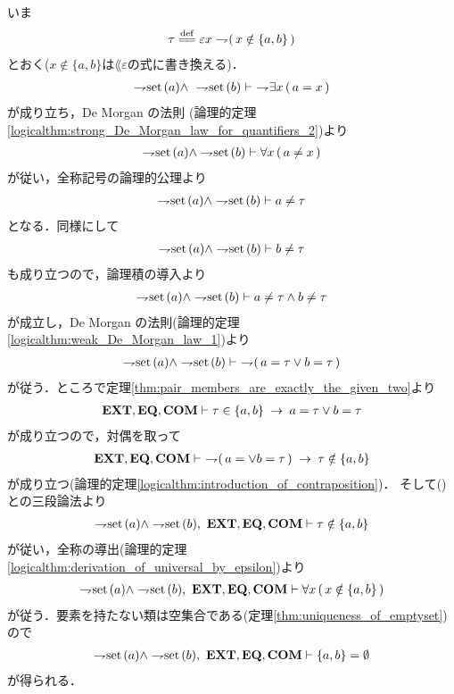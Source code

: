 	\begin{sketch}
		いま
		\begin{align}
			\tau \defeq \varepsilon x \negation (\, x \notin \{a,b\}\, )
		\end{align}
		とおく($x \notin \{a,b\}$は$\lang{\varepsilon}$の式に書き換える)．
		\begin{align}
			\rightharpoondown\hspace{-0.25em} \operatorname*{set}\hspace{0.15em}(a) \wedge\ \rightharpoondown\hspace{-0.25em} \operatorname*{set}\hspace{0.15em}(b)
			\vdash\ \rightharpoondown\hspace{-0.25em} \exists x\, (\, a = x\, )
		\end{align}
		が成り立ち，De Morgan の法則
		(論理的定理\ref{logicalthm:strong_De_Morgan_law_for_quantifiers_2})より
		\begin{align}
			\rightharpoondown\hspace{-0.25em} \operatorname*{set}\hspace{0.15em}(a) \wedge \rightharpoondown\hspace{-0.25em} \operatorname*{set}\hspace{0.15em}(b)
			\vdash \forall x\, (\, a \neq x\, )
		\end{align}
		が従い，全称記号の論理的公理より
		\begin{align}
			\rightharpoondown\hspace{-0.25em} \operatorname*{set}\hspace{0.15em}(a) \wedge \rightharpoondown\hspace{-0.25em} \operatorname*{set}\hspace{0.15em}(b) \vdash a \neq \tau
		\end{align}
		となる．同様にして
		\begin{align}
			\rightharpoondown\hspace{-0.25em} \operatorname*{set}\hspace{0.15em}(a) \wedge \rightharpoondown\hspace{-0.25em} \operatorname*{set}\hspace{0.15em}(b) \vdash b \neq \tau
		\end{align}
		も成り立つので，論理積の導入より
		\begin{align}
			\rightharpoondown\hspace{-0.25em} \operatorname*{set}\hspace{0.15em}(a) \wedge \rightharpoondown\hspace{-0.25em} \operatorname*{set}\hspace{0.15em}(b) \vdash
			a \neq \tau \wedge b \neq \tau
		\end{align}
		が成立し，De Morgan の法則(論理的定理\ref{logicalthm:weak_De_Morgan_law_1})より
		\begin{align}
			\negation \set{a} \wedge \negation \set{b} \vdash\ 
			\negation (\, a = \tau \vee b = \tau\, )
			\label{fom:pair_of_proper_classes_is_emptyset_1}
		\end{align}
		が従う．ところで定理\ref{thm:pair_members_are_exactly_the_given_two}より
		\begin{align}
			\mbox{{\bf EXT}},\mbox{{\bf EQ}},\mbox{\bf COM} \vdash \tau \in \{a,b\} \hspace{0.25em}\rightarrow\hspace{0.25em} a = \tau \vee b = \tau
		\end{align}
		が成り立つので，対偶を取って
		\begin{align}
			\EXTAX,\EQAX,\COMAX \vdash\ 
			\negation (\, a = \vee b = \tau\, ) \rarrow \tau \notin \{a,b\}
		\end{align}
		が成り立つ(論理的定理\ref{logicalthm:introduction_of_contraposition})．
		そして()との三段論法より
		\begin{align}
			\negation \set{a} \wedge \negation \set{b},\ \EXTAX,\EQAX,\COMAX \vdash
			\tau \notin \{a,b\}
		\end{align}
		が従い，全称の導出(論理的定理\ref{logicalthm:derivation_of_universal_by_epsilon})より
		\begin{align}
			\negation \set{a} \wedge \negation \set{b},\ \EXTAX,\EQAX,\COMAX \vdash
			\forall x\, (\, x \notin \{a,b\}\, )
		\end{align}
		が従う．要素を持たない類は空集合である(定理\ref{thm:uniqueness_of_emptyset})ので
		\begin{align}
			\negation \set{a} \wedge \negation \set{b},\ \EXTAX,\EQAX,\COMAX \vdash
			\{a,b\} = \emptyset
		\end{align}
		が得られる．
		\QED
	\end{sketch}
	

